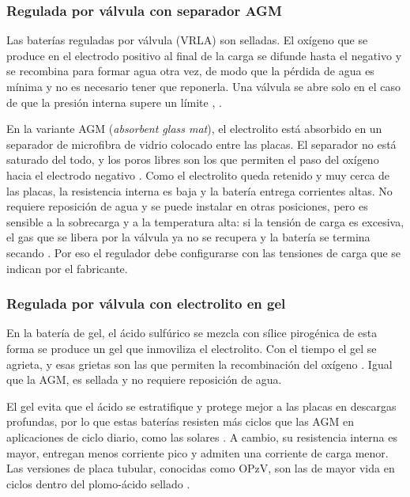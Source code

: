 \subsubsection{Regulada por válvula con separador AGM}

Las baterías reguladas por válvula (VRLA) son selladas. El oxígeno que se produce en el electrodo positivo al final de la carga se difunde hasta el negativo y se recombina para formar agua otra vez, de modo que la pérdida de agua es mínima y no es necesario tener que reponerla. Una válvula se abre solo en el caso de que la presión interna supere un límite \cite{linden}, \cite{pavlov}.

En la variante AGM (\emph{absorbent glass mat}), el electrolito está absorbido en un separador de microfibra de vidrio colocado entre las placas. El separador no está saturado del todo, y los poros libres son los que permiten el paso del oxígeno hacia el electrodo negativo \cite{pavlov}. Como el electrolito queda retenido y muy cerca de las placas, la resistencia interna es baja y la batería entrega corrientes altas. No requiere reposición de agua y se puede instalar en otras posiciones, pero es sensible a la sobrecarga y a la temperatura alta: si la tensión de carga es excesiva, el gas que se libera por la válvula ya no se recupera y la batería se termina secando \cite{linden}. Por eso el regulador debe configurarse con las tensiones de carga que se indican por el fabricante.

\subsubsection{Regulada por válvula con electrolito en gel}

En la batería de gel, el ácido sulfúrico se mezcla con sílice pirogénica de esta forma se produce un gel que inmoviliza el electrolito. Con el tiempo el gel se agrieta, y esas grietas son las que permiten la recombinación del oxígeno \cite{pavlov}. Igual que la AGM, es sellada y no requiere reposición de agua.

El gel evita que el ácido se estratifique y protege mejor a las placas en descargas profundas, por lo que estas baterías resisten más ciclos que las AGM en aplicaciones de ciclo diario, como las solares \cite{pavlov}. A cambio, su resistencia interna es mayor, entregan menos corriente pico y admiten una corriente de carga menor. Las versiones de placa tubular, conocidas como OPzV, son las de mayor vida en ciclos dentro del plomo-ácido sellado \cite{pavlov}.

